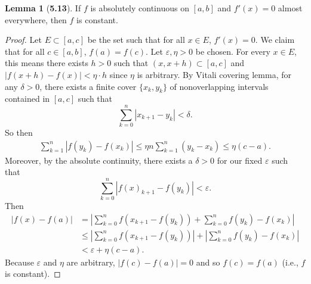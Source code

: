 \documentclass[12pt]{article}
\renewcommand{\epsilon}{\varepsilon}
\theoremstyle{definition}
\newtheorem*{lemma}{Lemma}
\begin{document}
\begin{lemma}[\textbf{5.13}]

    If \( f \) is absolutely continuous on \( [a,b] \) and \( f'(x) = 0 \) almost everywhere, then \( f \) is constant. 
    
    \begin{proof}
        Let \( E \subset [a, c] \) be the set such that for all \( x \in E \), \( f'(x) = 0 \).
        We claim that for all \( c \in [a,b] \), \( f(a) = f(c) \). 
        Let \( \epsilon, \eta > 0 \) be chosen. 
        For every \( x \in E \), this means there exists \( h > 0 \) such that 
        \( (x, x + h) \subset [a,c] \) and \( |f(x + h) - f(x)| < \eta \cdot h \) since \( \eta \) is arbitrary.
        By Vitali covering lemma, for any \( \delta > 0 \), there exists a finite cover \( \{ x_k, y_k \} \) 
        of nonoverlapping intervals contained in \( [a,c]\)
        such that 
            \[
                \sum_{k=0}^{n} | x_{k+1} - y_k | < \delta.     
            \]
        So then 
            \begin{align*}
                \sum_{k=1}^{n} |f(y_k) - f(x_k)| \leq \eta n \sum_{k=1}^{n} (y_k - x_k) \leq \eta (c-a).
            \end{align*}
        Moreover, by the absolute continuity, there exists a \( \delta > 0 \) for our fixed \( \epsilon \) such that
            \[
                \sum_{k=0}^{n} |f(x)_{k+1} - f(y_k)|  < \epsilon.
            \]
        Then 
            \begin{align*}
                |f(x) - f(a)| &= \left| \sum_{k=0}^{n} f(x_{k+1} - f(y_k)) + \sum_{k=0}^{n} f(y_k) - f(x_k) \right| \\
                &\leq \left| \sum_{k=0}^{n} f(x_{k+1} - f(y_k)) \right| +  \left| \sum_{k=0}^{n} f(y_k) - f(x_k) \right| \\
                &< \epsilon + \eta(c-a).
            \end{align*}
        Because \( \epsilon \) and \( \eta \) are arbitrary, \( |f(c) - f(a)| = 0 \)
        and so \( f(c) = f(a) \) (i.e., \( f \) is constant).
    \end{proof}
\end{lemma}
\end{document}
